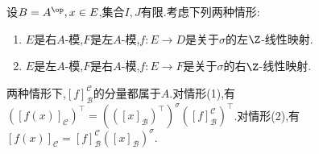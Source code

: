 \begin{remark}{}{}
	设$B=A^{\op},x\in E$,集合$I,J$有限.考虑下列两种情形:
	\begin{enumerate}
		\item $E$是右$A$-模,$F$是左$A$-模,$f:E\to D$是关于$\sigma$的左$\Z$-线性映射.
		\item $E$是左$A$-模,$F$是右$A$-模,$f:E\to F$是关于$\sigma$的右$\Z$-线性映射.
	\end{enumerate}
	两种情形下,$\left[f\right]_{\mathcal{B}}^{\mathcal{C}}$的分量都属于$A$.对情形(1),有$\left(\left[f\left(x\right)\right]_{\mathcal{C}}\right)^{\top}=\left(\left(\left[x\right]_{\mathcal{B}}\right)^{\top}\right)^{\sigma}\left(\left[f\right]_{\mathcal{B}}^{\mathcal{C}}\right)^{\top}$.对情形(2),有$\left[f\left(x\right)\right]_{\mathcal{C}}=\left[f\right]_{\mathcal{B}}^{\mathcal{C}}\left(\left[x\right]_{\mathcal{B}}\right)^{\sigma}$.
\end{remark}



















